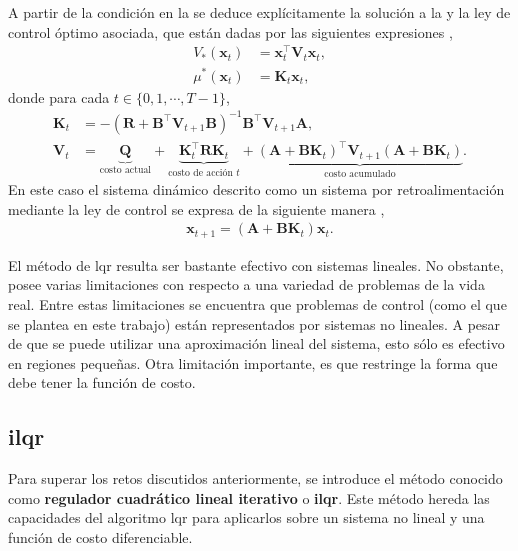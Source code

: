  A partir de la condición en la  se deduce explícitamente la solución a la  y la ley de control óptimo asociada, que están dadas por las siguientes expresiones \cite{Bertsekas1995a},
\begin{align}
    V_{*}(\mathbf{x}_t) &= \mathbf{x}_t^{\top}\mathbf{V}_{t}\mathbf{x}_t, \\
    \mu^{*}(\mathbf{x}_t)&= \mathbf{K}_{t}\mathbf{x}_t,
\end{align}
donde para cada $t \in \{0, 1, \cdots, T-1\}$,
\begin{align}
    \mathbf{K}_t &= - (\mathbf{R}+\mathbf{B}^{\top}\mathbf{V}_{t+1}\mathbf{B})^{-1}\mathbf{B}^{\top}\mathbf{V}_{t+1}\mathbf{A}, \\
    \mathbf{V}_{t} &= \underbrace{\mathbf{Q}}_{\text{costo actual}} + \underbrace{\mathbf{K}_t^{\top}\mathbf{R}\mathbf{K}_t}_{\text{costo de acción $t$}} + 
    \underbrace{(\mathbf{A}+\mathbf{B}\mathbf{K}_{t})^{\top}
    \mathbf{V}_{t+1}
    (\mathbf{A}+\mathbf{B}\mathbf{K}_{t})}_{\text{costo acumulado}}.
\end{align}
En este caso el sistema dinámico descrito como un sistema por retroalimentación mediante la ley de control se expresa de la siguiente manera \cite{underactuated}, 
\begin{align}
    \mathbf{x}_{t+1} = (\mathbf{A} +\mathbf{B}\mathbf{K}_{t})\mathbf{x}_t.
\end{align}

El método de \acrshort{lqr} resulta ser bastante efectivo con sistemas lineales. No obstante, posee varias limitaciones con respecto a una variedad de problemas de la vida real. Entre estas limitaciones se encuentra que problemas de control (como el que se plantea en este trabajo) están representados por sistemas no lineales. A pesar de que se puede utilizar una aproximación lineal del sistema, esto sólo es efectivo en regiones pequeñas. Otra limitación importante, es que restringe la forma que debe tener la función de costo. 

\subsection{\acrlong{ilqr}}\label{sub_sec:iLQR}

Para superar los retos discutidos anteriormente, se introduce el método conocido como \textbf{regulador cuadrático lineal iterativo} o \textbf{\acrfull{ilqr}}. Este método hereda las capacidades del algoritmo \acrshort{lqr} para aplicarlos sobre un sistema no lineal y una función de costo diferenciable. 

